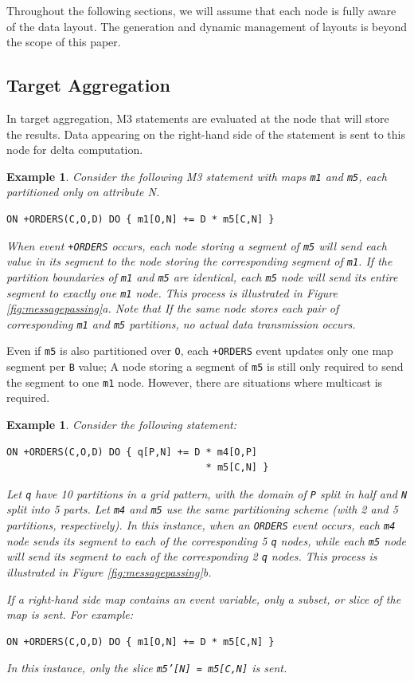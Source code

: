 \documentclass{vldb}
\newtheorem{example}[theorem]{Example}
\begin{document}
Throughout the following sections, we will assume that each node is fully aware of the data layout.  The generation and dynamic management of layouts is beyond the scope of this paper.

\subsection{Target Aggregation}
In target aggregation, M3 statements are evaluated at the node that will store the results.  Data appearing on the right-hand side of the statement is sent to this node for delta computation.  

\begin{example}
Consider the following M3 statement with maps \texttt{m1} and \texttt{m5}, each partitioned only on attribute N.
\begin{verbatim}
ON +ORDERS(C,O,D) DO { m1[O,N] += D * m5[C,N] }
\end{verbatim}
When event \texttt{+ORDERS} occurs, each node storing a segment of \texttt{m5} will send each value in its segment to the node storing the corresponding segment of \texttt{m1}.  If the partition boundaries of \texttt{m1} and \texttt{m5} are identical, each \texttt{m5} node will send its entire segment to exactly one \texttt{m1} node.  This process is illustrated in Figure \ref{fig:messagepassing}a.  Note that If the same node stores each pair of corresponding \texttt{m1} and \texttt{m5} partitions, no actual data transmission occurs.  
\end{example}

Even if \texttt{m5} is also partitioned over \texttt{O}, each \texttt{+ORDERS} event updates only one map segment per \texttt{B} value; A node storing a segment of \texttt{m5} is still only required to send the segment to one \texttt{m1} node.  However, there are situations where multicast is required.  

\begin{example}
Consider the following statement:
\begin{verbatim}
ON +ORDERS(C,O,D) DO { q[P,N] += D * m4[O,P] 
                                   * m5[C,N] }
\end{verbatim}
Let \texttt{q} have 10 partitions in a grid pattern, with the domain of \texttt{P} split in half and \texttt{N} split into 5 parts.  Let \texttt{m4} and \texttt{m5} use the same partitioning scheme (with 2 and 5 partitions, respectively).  In this instance, when an \texttt{ORDERS} event occurs, each \texttt{m4} node sends its segment to each of the corresponding 5 \texttt{q} nodes, while each \texttt{m5} node will send its segment to each of the corresponding 2 \texttt{q} nodes.  This process is illustrated in Figure \ref{fig:messagepassing}b. 

If a right-hand side map contains an event variable, only a subset, or slice of the map is sent.  For example:
\begin{verbatim}
ON +ORDERS(C,O,D) DO { m1[O,N] += D * m5[C,N] }
\end{verbatim}
In this instance, only the slice \texttt{m5'[N] = m5[C,N]} is sent.
\end{example}
\end{document}
